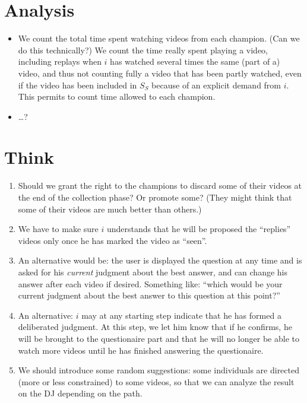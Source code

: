 \documentclass[version=3.21, pagesize, twoside=off, bibliography=totoc, DIV=calc, fontsize=12pt, a4paper]{scrartcl}
\begin{document}
\section{Analysis}
\begin{itemize}
	\item We count the total time spent watching videos from each champion. (Can we do this technically?) We count the time really spent playing a video, including replays when $i$ has watched several times the same (part of a) video, and thus not counting fully a video that has been partly watched, even if the video has been included in $S_S$ because of an explicit demand from $i$. This permits to count time allowed to each champion.
	\item …?
\end{itemize}

\section{Think}
\begin{enumerate}
	\item Should we grant the right to the champions to discard some of their videos at the end of the collection phase? Or promote some? (They might think that some of their videos are much better than others.)
	\item We have to make sure $i$ understands that he will be proposed the “replies” videos only once he has marked the video as “seen”.
	\item An alternative would be: the user is displayed the question at any time and is asked for his \emph{current} judgment about the best answer, and can change his answer after each video if desired. Something like: “which would be your current judgment about the best answer to this question at this point?”
	\item An alternative: $i$ may at any starting step indicate that he has formed a deliberated judgment. At this step, we let him know that if he confirms, he will be brought to the questionaire part and that he will no longer be able to watch more videos until he has finished answering the questionaire.
	\item We should introduce some random suggestions: some individuals are directed (more or less constrained) to some videos, so that we can analyze the result on the DJ depending on the path.
\end{enumerate}
\end{document}
